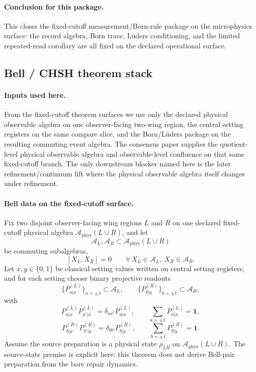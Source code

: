 \documentclass[11pt]{article}
\begin{document}
\paragraph{Conclusion for this package.}
This closes the fixed-cutoff measurement/Born-rule package on the microphysics surface: the
record algebra, Born trace, L\"uders conditioning, and the limited repeated-read corollary are
all fixed on the declared operational surface.

\subsection{Bell / CHSH theorem stack}

\paragraph{Inputs used here.}
From the fixed-cutoff theorem surfaces we use only the declared physical
observable algebra on one observer-facing two-wing region, the central setting registers on the
same compare slice, and the Born/L\"uders package on the resulting commuting event algebra. The
consensus paper supplies the quotient-level physical observable algebra and observable-level
confluence on that same fixed-cutoff branch. The only downstream blocker named here is the later
refinement/continuum lift where the physical observable algebra itself changes under refinement.

\paragraph{Bell data on the fixed-cutoff surface.}
Fix two disjoint observer-facing wing regions \(L\) and \(R\) on one declared fixed-cutoff
physical algebra \(\mathcal A_{\mathrm{phys}}(L\cup R)\), and let
\[
\mathcal A_L,\mathcal A_R\subset \mathcal A_{\mathrm{phys}}(L\cup R)
\]
be commuting subalgebras,
\[
[X_L,X_R]=0
\qquad
\forall\, X_L\in\mathcal A_L,\ X_R\in\mathcal A_R.
\]
Let \(x,y\in\{0,1\}\) be classical setting values written on central setting registers, and for
each setting choose binary projective readouts
\[
\{P_{a|x}^{(L)}\}_{a=\pm1}\subset\mathcal A_L,
\qquad
\{P_{b|y}^{(R)}\}_{b=\pm1}\subset\mathcal A_R,
\]
with
\[
P_{a|x}^{(L)}P_{a'|x}^{(L)}=\delta_{aa'}P_{a|x}^{(L)},
\qquad
\sum_{a=\pm1}P_{a|x}^{(L)}=\mathbf 1,
\]
\[
P_{b|y}^{(R)}P_{b'|y}^{(R)}=\delta_{bb'}P_{b|y}^{(R)},
\qquad
\sum_{b=\pm1}P_{b|y}^{(R)}=\mathbf 1.
\]
Assume the source preparation is a physical state \(\rho_{LR}\) on
\(\mathcal A_{\mathrm{phys}}(L\cup R)\). The source-state premise is explicit here: this theorem
does not derive Bell-pair preparation from the bare repair dynamics.
\end{document}
